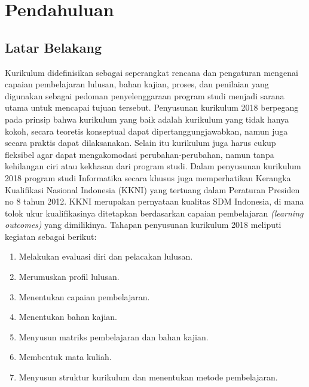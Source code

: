 \chapter{Pendahuluan}
\label{chap:Pendahuluan}
   
\section{Latar Belakang}
\label{sec:Latar Belakang}

Kurikulum didefinisikan sebagai seperangkat rencana dan pengaturan mengenai capaian pembelajaran 
lulusan, bahan kajian, proses, dan penilaian yang digunakan sebagai pedoman penyelenggaraan program studi menjadi sarana utama untuk mencapai tujuan tersebut. Penyusunan kurikulum 2018 berpegang pada prinsip bahwa 
kurikulum yang baik adalah kurikulum yang tidak hanya kokoh, secara teoretis konseptual dapat dipertanggungjawabkan, namun juga secara praktis dapat dilaksanakan. Selain itu kurikulum juga harus cukup fleksibel agar dapat mengakomodasi perubahan-perubahan, namun tanpa kehilangan ciri atau kekhasan dari program studi. Dalam penyusunan kurikulum 2018 program studi Informatika secara khusus juga memperhatikan Kerangka Kualifikasi Nasional Indonesia (KKNI) yang tertuang dalam Peraturan Presiden no 8 tahun 2012. KKNI merupakan pernyataan kualitas SDM Indonesia, di mana tolok ukur kualifikasinya ditetapkan berdasarkan capaian 
pembelajaran \textit{(learning outcomes)} yang dimilikinya. Tahapan penyusunan kurikulum 2018 meliputi kegiatan sebagai berikut: 
\begin{enumerate}
\item Melakukan evaluasi diri dan pelacakan lulusan.
\item Merumuskan profil lulusan.
\item Menentukan capaian pembelajaran.
\item Menentukan bahan kajian.
\item Menyusun matriks pembelajaran dan bahan kajian.
\item Membentuk mata kuliah.
\item Menyusun struktur kurikulum dan menentukan metode pembelajaran.
\end{enumerate}


